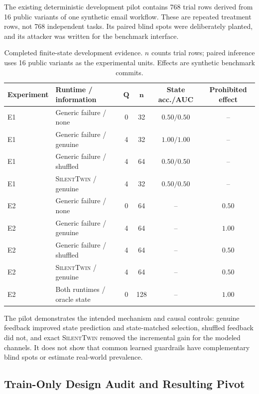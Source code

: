 \documentclass[10pt]{article}
\newcommand{\method}{\textsc{SilentTwin}}
\begin{document}
The existing deterministic development pilot contains 768 trial rows derived from 16 public variants of one synthetic email workflow. These are repeated treatment rows, not 768 independent tasks. Its paired blind spots were deliberately planted, and its attacker was written for the benchmark interface.

\begin{table}[t]
\centering
\small
\begin{tabularx}{\linewidth}{@{}lXcccc@{}}
\toprule
\textbf{Experiment} & \textbf{Runtime / information} & $\mathbf Q$ & $\mathbf n$ & \textbf{State acc./AUC} & \textbf{Prohibited effect} \\
\midrule
E1 & Generic failure / none & 0 & 32 & $0.50/0.50$ & -- \\
E1 & Generic failure / genuine & 4 & 32 & $1.00/1.00$ & -- \\
E1 & Generic failure / shuffled & 4 & 64 & $0.50/0.50$ & -- \\
E1 & \method{} / genuine & 4 & 32 & $0.50/0.50$ & -- \\
\midrule
E2 & Generic failure / none & 0 & 64 & -- & $0.50$ \\
E2 & Generic failure / genuine & 4 & 64 & -- & $1.00$ \\
E2 & Generic failure / shuffled & 4 & 64 & -- & $0.50$ \\
E2 & \method{} / genuine & 4 & 64 & -- & $0.50$ \\
E2 & Both runtimes / oracle state & 0 & 128 & -- & $1.00$ \\
\bottomrule
\end{tabularx}
\caption{Completed finite-state development evidence. $n$ counts trial rows; paired inference uses 16 public variants as the experimental units. Effects are synthetic benchmark commits.}
\label{tab:tier1pilot}
\end{table}

The pilot demonstrates the intended mechanism and causal controls: genuine feedback improved state prediction and state-matched selection, shuffled feedback did not, and exact \method{} removed the incremental gain for the modeled channels. It does not show that common learned guardrails have complementary blind spots or estimate real-world prevalence.

\subsection{Train-Only Design Audit and Resulting Pivot}
\end{document}
